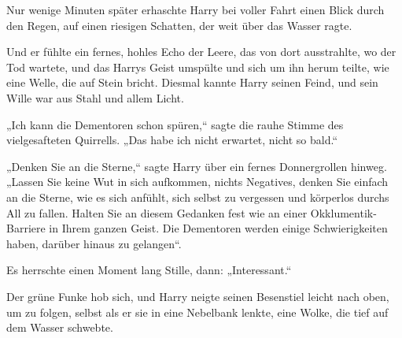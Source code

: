 Nur wenige Minuten später erhaschte Harry bei voller Fahrt einen Blick durch den Regen, auf einen riesigen Schatten, der weit über das Wasser ragte.

Und er fühlte ein fernes, hohles Echo der Leere, das von dort ausstrahlte, wo der Tod wartete, und das Harrys Geist umspülte und sich um ihn herum teilte, wie eine Welle, die auf Stein bricht. Diesmal kannte Harry seinen Feind, und sein Wille war aus Stahl und allem Licht.

„Ich kann die Dementoren schon spüren,“ sagte die rauhe Stimme des vielgesafteten Quirrells. „Das habe ich nicht erwartet, nicht so bald.“

„Denken Sie an die Sterne,“ sagte Harry über ein fernes Donnergrollen hinweg. „Lassen Sie keine Wut in sich aufkommen, nichts Negatives, denken Sie einfach an die Sterne, wie es sich anfühlt, sich selbst zu vergessen und körperlos durchs All zu fallen. Halten Sie an diesem Gedanken fest wie an einer Okklumentik-Barriere in Ihrem ganzen Geist. Die Dementoren werden einige Schwierigkeiten haben, darüber hinaus zu gelangen“.

Es herrschte einen Moment lang Stille, dann: „Interessant.“

Der grüne Funke hob sich, und Harry neigte seinen Besenstiel leicht nach oben, um zu folgen, selbst als er sie in eine Nebelbank lenkte, eine Wolke, die tief auf dem Wasser schwebte.

